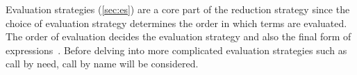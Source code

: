 Evaluation strategies (\autoref{sec:es}) are a core part of the reduction strategy since the choice of evaluation strategy determines the order in which terms are evaluated.
The order of evaluation decides the evaluation strategy and also the final form of expressions~\cite{sestoft2002demonstrating}.
Before delving into more complicated evaluation strategies such as call by need, call by name will be considered.

